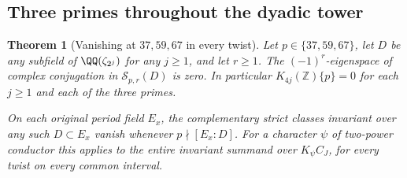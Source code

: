 \documentclass[a4paper,11pt]{article}
\newtheorem{theorem}[proposition]{Theorem}
\theoremstyle{definition}
\theoremstyle{remark}
\newcommand{\ZZ}{\mathbb Z}\newcommand{\ord}{\operatorname{ord}}
\numberwithin{equation}{section}
\begin{document}
\subsection{Three primes throughout the dyadic tower}\label{nav:I-59}
\begin{theorem}[Vanishing at \(37,59,67\) in every twist]\leavevmode
\label{thm:towerzero267}
Let \(p\in\{37,59,67\}\), let \(D\) be any subfield of
\(\QQ(\zeta_{2^j})\) for any \(j\ge1\), and let \(r\ge1\).
The \((-1)^r\)-eigenspace of complex conjugation in
\(\mathcal S_{p,r}(D)\) is zero. In particular \(K_{4j}(\ZZ)\{p\}=0\)
for each \(j\ge1\) and each of the three primes.

On each original period field \(E_x\), the complementary
strict classes invariant over any such \(D\subset E_x\) vanish
whenever \(p\nmid[E_x:D]\). For a character \(\psi\) of two-power
conductor this applies to the entire invariant summand over
\(K_\psi C_J\), for every twist on every common interval.
\end{theorem}
\end{document}
